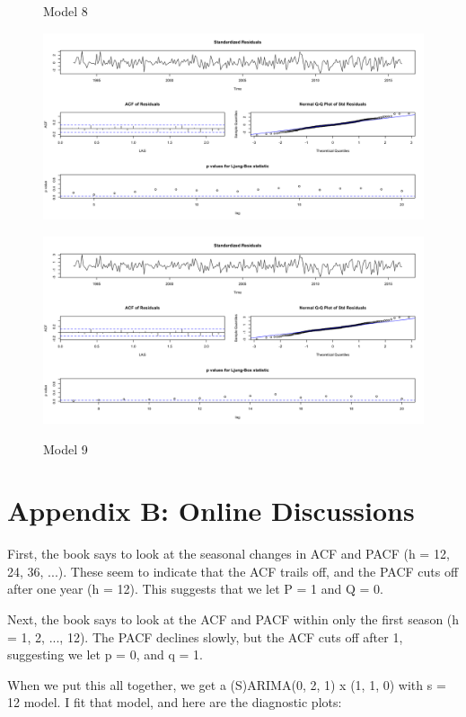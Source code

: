 \documentclass[twoside,twocolumn]{article}
\begin{document}
              \begin{figure}[H]
    	\centering
     	\caption{Model 8}
     	\includegraphics[width=\linewidth]{images/sarima8}
     	\label{fig:sarima8}
     	\caption{Model 9}
     	\includegraphics[width=\linewidth]{images/sarima9}
     	\label{fig:sarima9}
      \end{figure}
      
      \section*{Appendix B: Online Discussions}\label{App:AppendixB}
      
          First, the book says to look at the seasonal changes in ACF and PACF (h = 12, 24, 36, ...). These seem to indicate that the ACF trails off, and the PACF cuts off after one year (h = 12). This suggests that we let P = 1 and Q = 0.

Next, the book says to look at the ACF and PACF within only the first season (h = 1, 2, ..., 12). The PACF declines slowly, but the ACF cuts off after 1, suggesting we let p = 0, and q = 1.

When we put this all together, we get a (S)ARIMA(0, 2, 1) x (1, 1, 0) with s = 12 model. I fit that model, and here are the diagnostic plots:
\end{document}
